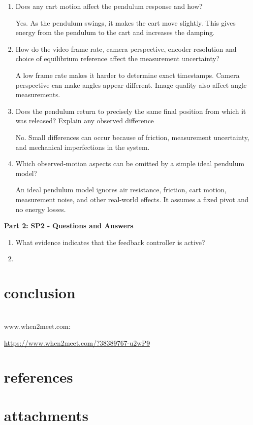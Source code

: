 \documentclass{article}
\begin{document}
\begin{enumerate}
The peaks are not perfectly symmetric. This may be caused by friction, slight measurement errors, camera perspective, or small movements of the cart.

\item Does any cart motion affect the pendulum response and how?

Yes. As the pendulum swings, it makes the cart move slightly. This gives energy from the pendulum to the cart and increases the damping.

\item How do the video frame rate, camera perspective, encoder resolution and choice of
equilibrium reference affect the measurement uncertainty?

A low frame rate makes it harder to determine exact timestamps. Camera perspective can make angles appear different. Image quality also affect angle measurements. 

\item Does the pendulum return to precisely the same final position from which it was
released? Explain any observed difference

No. Small differences can occur because of friction, measurement uncertainty, and mechanical imperfections in the system.

\item Which observed-motion aspects can be omitted by a simple ideal pendulum model?

An ideal pendulum model ignores air resistance, friction, cart motion, measurement noise, and other real-world effects. It assumes a fixed pivot and no energy losses.

 \end{enumerate}

 \textbf{Part 2: SP2 - Questions and Answers}

\begin{enumerate}

 \item What evidence indicates that the feedback controller is active?

 \item

\end{enumerate}



\section{conclusion}

\section{}
www.when2meet.com:

\url{https://www.when2meet.com/?38389767-u2wP9}
\section{references}
\section{attachments}
\end{document}
